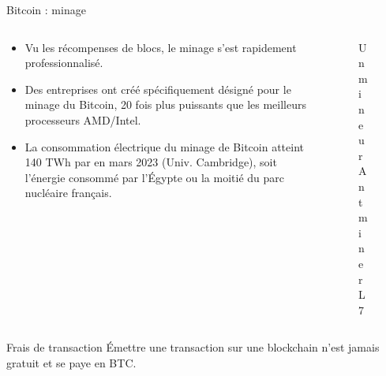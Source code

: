 \begin{frame}{Bitcoin : minage}
  \begin{columns}
    \begin{column}{0.6\textwidth}
      \begin{itemize}
        \item Vu les récompenses de blocs, le minage s'est rapidement professionnalisé.
        \item Des entreprises ont créé spécifiquement désigné pour le minage du Bitcoin, 20 fois plus puissants que les meilleurs processeurs AMD/Intel.
        \item La consommation électrique du minage de Bitcoin atteint 140 TWh par en mars 2023 (Univ. Cambridge), soit l'énergie consommé par l'Égypte ou la moitié du parc nucléaire français.
      \end{itemize}
    \end{column}

    \begin{column}{0.3\textwidth}
      \begin{figure}

        \caption{Un mineur Antminer L7}
      \end{figure}
    \end{column}
    \begin{column}{0.1\textwidth}\end{column}
  \end{columns}
\end{frame}

\begin{frame}{Frais de transaction}
  Émettre une transaction sur une blockchain n'est jamais gratuit et se paye en BTC.

  
\end{frame}